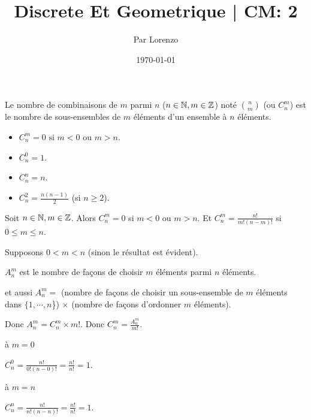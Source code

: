 \documentclass[a4paper, 12pt]{article}
\title{Discrete Et Geometrique | CM: 2}
\author{Par Lorenzo}
\date{\today}
\begin{document}
\maketitle

\begin{definition}
    Le nombre de combinaisons de $m$ parmi $n$ ($n \in \mathbb{N}, m \in \mathbb{Z}$) noté $\binom{n}{m}$ (ou $C^m_n$) est le nombre de sous-ensembles de $m$ éléments d'un ensemble à $n$ éléments.
\end{definition}

\begin{remark}
    \begin{itemize}.
        \item $C^m_n = 0 \text{ si } m \lt 0 \text{ ou } m \gt n$.
        \item $C^0_n = 1$.
        \item $C^n_n = n$.
        \item $C^2_n = \frac{n(n-1)}{2}$ (si $n \geq 2$).
    \end{itemize}
\end{remark}

\begin{proposition}
    Soit $n \in \mathbb{N}, m \in \mathbb{Z}$. Alors $C^m_n = 0$ si $m \lt 0$ ou $m \gt n$.
    Et $C^m_n = \frac{n!}{m!(n-m)!}$ si $0 \leq m \leq n$.    
\end{proposition}

\begin{demonstration}
    Supposons $0 \lt m \lt n$ (sinon le résultat est évident).

    $A^m_n$ est le nombre de façons de choisir $m$ éléments parmi $n$ éléments.

    et aussi $A^m_n =$ (nombre de façons de choisir un sous-ensemble de $m$ éléments dans $\{1, \cdots, n$\}) $\times$ (nombre de façons d'ordonner $m$ éléments).

    Donc $A^m_n = C^m_n \times m!$. Donc $C^m_n = \frac{A^m_n}{m!}$.
\end{demonstration}

\begin{remark}
    à $m = 0$

    $C^0_n = \frac{n!}{0!(n-0)!} = \frac{n!}{n!} = 1$.
\end{remark}

\begin{remark}
    à $m = n$

    $C^n_n = \frac{n!}{n!(n-n)!} = \frac{n!}{n!} = 1$.
\end{remark}
\end{document}
